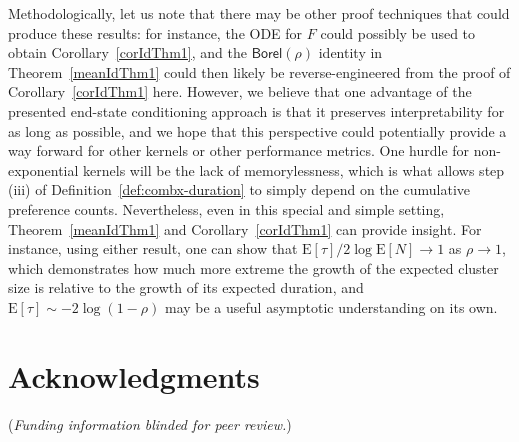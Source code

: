 \documentclass[opre,nonblindrev]{informs3_no_remark}
\newcommand{\tr}{\textcolor{red}}
\newcommand{\tb}{\textcolor{blue}}
\newcommand{\E}[1]{{\mathrm{E}\left[#1\right]}}
\begin{document}
Methodologically, let us note that there may be other proof techniques that could produce these results: for instance, the \citet{moller2005perfect} ODE for $F$ could possibly be used to obtain Corollary~\ref{corIdThm1}, and the $\mathsf{Borel}(\rho)$ identity in Theorem~\ref{meanIdThm1} could then likely be reverse-engineered from the proof of Corollary~\ref{corIdThm1} here. However, we believe that one advantage of the presented end-state conditioning approach is that it preserves interpretability for as long as possible, and we hope that this perspective could potentially provide a way forward for other kernels or other performance metrics. One hurdle for non-exponential kernels will be the lack of memorylessness, which is what allows step (iii) of Definition~\ref{def:combx-duration} to simply depend on the cumulative preference counts. Nevertheless, even in this special and simple setting, Theorem~\ref{meanIdThm1} and Corollary~\ref{corIdThm1} can provide insight. For instance, using either result, one can show that $\E{\tau}/2\log\E{N} \to 1$ as $\rho \to 1$, which demonstrates how much more extreme the growth of the expected cluster size is relative to the growth of its expected duration, and $\E{\tau} \sim -2\log(1-\rho)$ may be a useful asymptotic understanding on its own.









\newpage

\section*{Acknowledgments}

(\textit{Funding information blinded for peer review.})

\end{document}
